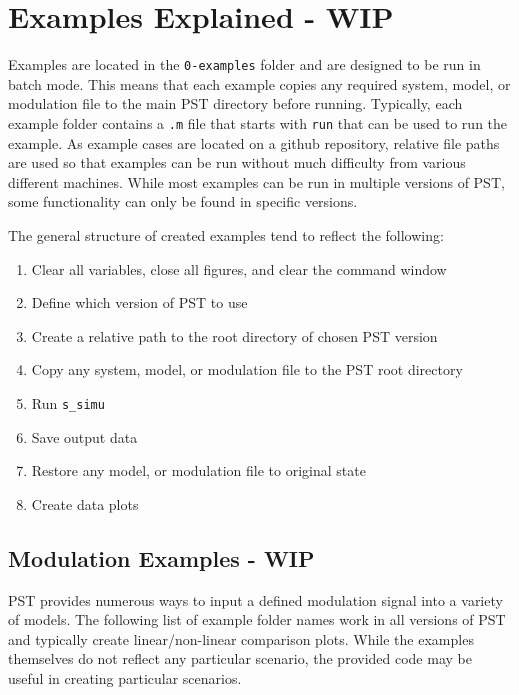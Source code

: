 \chapter{Examples Explained - WIP}
Examples are located in the \verb|0-examples| folder and are designed to be run in batch mode.
This means that each example copies any required system, model, or modulation file to the main PST directory before running.
Typically, each example folder contains a \verb|.m| file that starts with \verb|run| that can be used to run the example.
As example cases are located on a github repository, relative file paths are used so that examples can be run without much difficulty from various different machines.
While most examples can be run in multiple versions of PST, some functionality can only be found in specific versions.

\noindent The general structure of created examples tend to reflect the following:
\begin{enumerate}
\itemsep 0em
\item Clear all variables, close all figures, and clear the command window
\item Define which version of PST to use
\item Create a relative path to the root directory of chosen PST version
\item Copy any system, model, or modulation file to the PST root directory
\item Run \verb|s_simu|
\item Save output data
\item Restore any model, or modulation file to original state
\item Create data plots
\end{enumerate}




\section{Modulation Examples - WIP} \label{sec: modExamples}
PST provides numerous ways to input a defined modulation signal into a variety of models.
The following list of example folder names work in all versions of PST and typically create linear/non-linear comparison plots.
While the examples themselves do not reflect any particular scenario, the provided code may be useful in creating particular scenarios.

